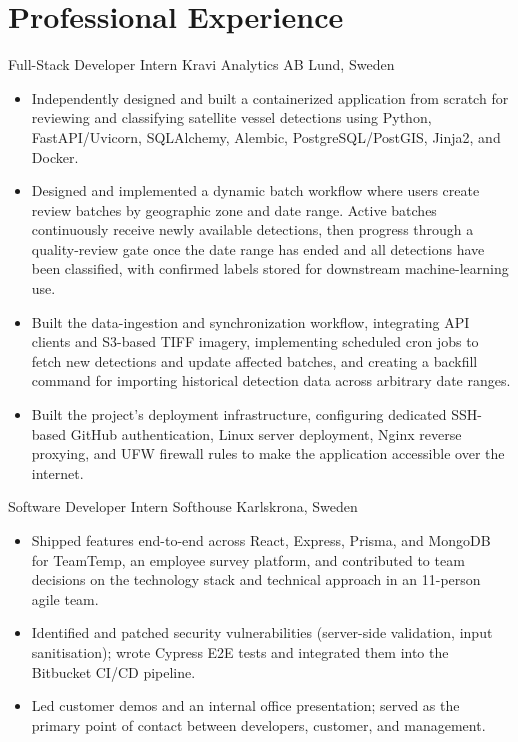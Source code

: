 \documentclass[11pt,a4paper,sans]{moderncv}
\begin{document}
\makecvtitle
\vspace{-1.5em}


\vspace{-0.6em}
\section{Professional Experience}

{Full-Stack Developer Intern}
{Kravi Analytics AB}
{Lund, Sweden}
{}
{
\begin{itemize}
\item Independently designed and built a containerized application from scratch for reviewing and classifying satellite vessel detections using Python, FastAPI/Uvicorn, SQLAlchemy, Alembic, PostgreSQL/PostGIS, Jinja2, and Docker.
\item Designed and implemented a dynamic batch workflow where users create review batches by geographic zone and date range. Active batches continuously receive newly available detections, then progress through a quality-review gate once the date range has ended and all detections have been classified, with confirmed labels stored for downstream machine-learning use.
\item Built the data-ingestion and synchronization workflow, integrating API clients and S3-based TIFF imagery, implementing scheduled cron jobs to fetch new detections and update affected batches, and creating a backfill command for importing historical detection data across arbitrary date ranges.
\item Built the project's deployment infrastructure, configuring dedicated SSH-based GitHub authentication, Linux server deployment, Nginx reverse proxying, and UFW firewall rules to make the application accessible over the internet.
\end{itemize}
}


{Software Developer Intern}
{Softhouse}
{Karlskrona, Sweden}
{}
{
\begin{itemize}
\item Shipped features end-to-end across React, Express, Prisma, and MongoDB for TeamTemp, an employee survey platform, and contributed to team decisions on the technology stack and technical approach in an 11-person agile team.
\item Identified and patched security vulnerabilities (server-side validation, input sanitisation); wrote Cypress E2E tests and integrated them into the Bitbucket CI/CD pipeline.
\item Led customer demos and an internal office presentation; served as the primary point of contact between developers, customer, and management.
\end{itemize}
}
\end{document}
